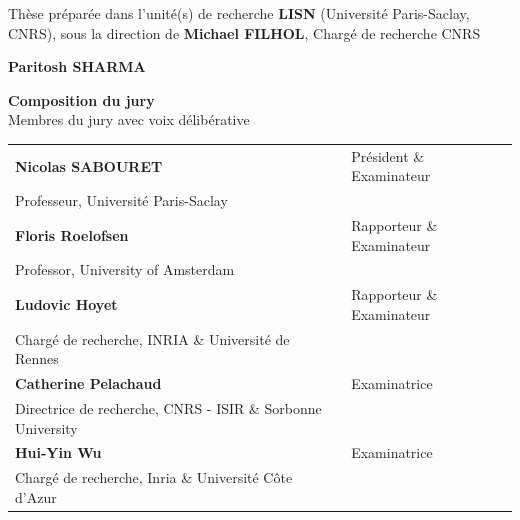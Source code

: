 \documentclass[english,12pt,a4paper]{book}
\begin{document}
\begin{titlepage}
\footnotesize Thèse préparée dans l'unité(s) de recherche \textbf{LISN} (Université Paris-Saclay, CNRS), sous la direction de \textbf{Michael FILHOL}, Chargé de recherche CNRS \\
\vspace{15mm}

\bigskip
\Large {\color{Prune} \textbf{Paritosh SHARMA}} %

\vspace{\fill} %

\bigskip

\flushleft
\small {\color{Prune} \textbf{Composition du jury}}\\
{\color{Prune} \scriptsize {Membres du jury avec voix délibérative}} \\
\vspace{2mm}
\scriptsize
\begin{tabular}{|p{7cm}l}
\arrayrulecolor{Prune}
\textbf{Nicolas SABOURET} & Président \& Examinateur\\ 
Professeur, Université Paris-Saclay \\
\textbf{Floris Roelofsen} &  Rapporteur \& Examinateur \\ 
Professor, University of Amsterdam \\ 
\textbf{Ludovic Hoyet} &  Rapporteur \& Examinateur \\ 
Chargé de recherche, INRIA \& Université de Rennes \\ 
\textbf{Catherine Pelachaud} &  Examinatrice \\ 
Directrice de recherche, CNRS - ISIR \& Sorbonne University \\ 
\textbf{Hui-Yin Wu} &  Examinatrice \\ 
Chargé de recherche, Inria \& Université Côte d'Azur \\ 
 

\end{tabular} 

\end{titlepage}


\thispagestyle{empty}
\selectfont
\end{document}
